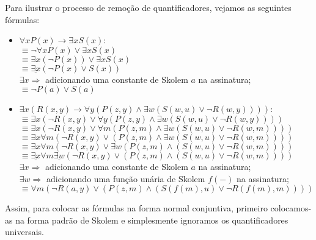 Para ilustrar o processo de remoção de quantificadores, vejamos as seguintes fórmulas:
\begin{itemize}
    \item $\forall xP(x) \rightarrow \exists x S(x)$: \\
    $\equiv \neg \forall xP(x) \lor \exists x S(x)$ \\
    $\equiv \exists x (\neg P(x)) \lor \exists xS(x)$ \\
    $\equiv \underline{\exists x}(\neg P(x) \lor S(x))$  \\
    $\exists x \Rightarrow$ adicionando uma constante de Skolem $a$ na assinatura; \\
    $\equiv \neg P(a) \lor S(a)$ 
    \item $\exists x(R(x,y) \rightarrow \forall y(P(z,y) \land \exists w(S(w,u) \lor \neg R(w,y))))$: \\
    $\equiv \exists x(\neg R(x,y) \lor \forall y(P(z,y) \land \exists w(S(w,u) \lor \neg R(w,y))))$ \\
    $\equiv \exists x(\neg R(x,y) \lor \forall m(P(z,m) \land \exists w(S(w,u) \lor \neg R(w,m))))$ \\
    $\equiv \exists x\forall m(\neg R(x,y) \lor (P(z,m) \land \exists w(S(w,u) \lor \neg R(w,m))))$ \\
    $\equiv \exists x\forall m(\neg R(x,y) \lor \exists w(P(z,m) \land (S(w,u) \lor \neg R(w,m))))$ \\
    $\equiv \underline{\exists x}\forall m\underline{\exists w}(\neg R(x,y) \lor (P(z,m) \land (S(w,u) \lor \neg R(w,m))))$  \\
    $\exists x \Rightarrow$ adicionando uma constante de Skolem $a$ na assinatura; \\
    $\exists w \Rightarrow$ adicionando uma função unária de Skolem $f(-)$ na assinatura; \\
    $\equiv \forall m(\neg R(a,y) \lor (P(z,m) \land (S(f(m),u) \lor \neg R(f(m),m))))$ 
\end{itemize}

Assim, para colocar as fórmulas na forma normal conjuntiva, primeiro colocamos-as na forma padrão de Skolem e simplesmente ignoramos os quantificadores universais.